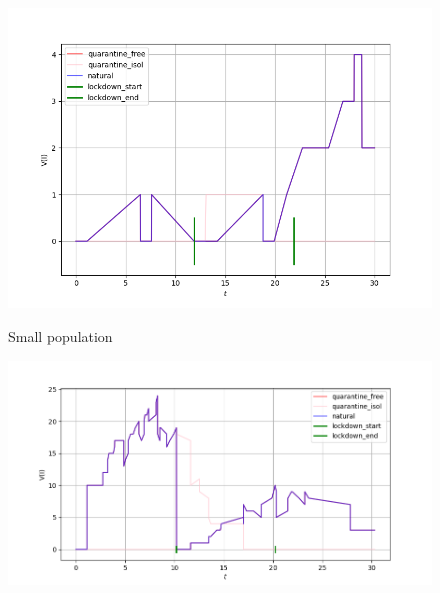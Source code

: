 	\begin{figure}[h]
		\begin{minipage}{0.49\linewidth}
			\includegraphics[width=\linewidth, keepaspectratio]{../figs/basic_experiment_small_population}
			
			\centering
			Small population
		\end{minipage}
		\begin{minipage}{0.49\linewidth}
			\includegraphics[width=\linewidth, keepaspectratio]{../figs/basic_experiment_medium_population}
			

\end{minipage}
\end{figure}

